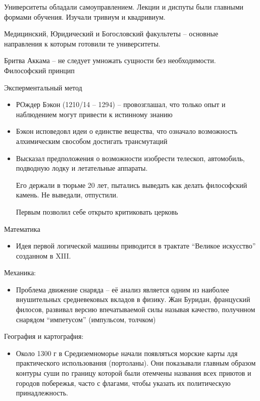 \documentclass{book}
\theoremstyle{definition}
\begin{document}
    Университеты обладали самоуправлением. Лекции и диспуты были главными формами обучения. Изучали тривиум и квадривиум.

    Медицинский, Юридический и Богословский факультеты -- основные направления к которым готовили те университеты.

    Бритва Аккама -- не следует умножать сущности без необходимости. Философский принцип

    Эксперментальный метод
    \begin{itemize}
        \item РОждер Бэкон (1210/14 -- 1294) -- провозглашал, что только опыт и наблюдением могут привести к истинному знанию
           \item Бэкон исповедовл идеи о единстве вещества, что означало возможность алхимическим свособом достигать трансмутаций
           \item Высказал предположения о возможности изобрести телескоп, автомобиль, подводную лодку и летательные аппараты.

               Его держали в тюрьме 20 лет, пытались выведать как делать философский камень. Не выведали, отпустили.

               Первым позволил себе открыто критиковать церковь
    \end{itemize}


    Математика
    \begin{itemize}
        \item Идея первой логической машины приводится в трактате ``Великое искусство'' созданном в XIII.
    \end{itemize}

    Механика:
    \begin{itemize}
        \item Проблема движение снаряда -- её анализ является одним из наиболее внушительных средневековых вкладов в физику. Жан Буридан, француский филосов, развивал версию впечатываемой силы называя качество, получнном снарядом ``импетусом'' (импульсом, толчком)
    \end{itemize}

    География и картография:
    \begin{itemize}
        \item Около 1300 г в Средиземноморье начали появляться морские карты лдя практического использования (портоланы). Они показывали главным образом контуры суши по границу которой были отемчены названия всех приютов и городов побережья, часто с флагами, чтобы указать их политическую принадлежность.
    \end{itemize}
\end{document}
